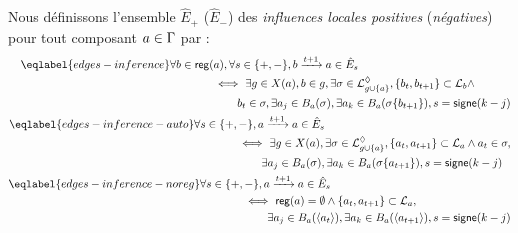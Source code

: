 \begin{proposition}
  Nous définissons l'ensemble $\hat{E}_+$ (\resp $\hat{E}_-$)
  des \emph{influences locales positives} (\resp \emph{négatives})
  pour tout composant $a \in \mathrm{\Gamma}$ par :
  \begin{align}
    \begin{split}\eqlabel{edges-inference}
      &\forall b \in \reg(a), \forall s \in \{ +, - \},
        b \xrightarrow{t+1} a \in \hat{E}_s \\
      &\qquad\qquad \Longleftrightarrow\ \exists g \in X(a), b \in g,
        \exists \sigma \in \PHsubl_{g \cup \{ a \}},
        \{ b_t, b_{t+1} \} \subset \PHl_b \wedge \\
      &\qquad\qquad\qquad b_t \in \sigma,
        \exists a_j \in \irB_a(\sigma),
        \exists a_k \in \irB_a(\sigma\{b_{t+1}\}),
        s = \f{signe}(k - j)
    \end{split} \\
    \begin{split}\eqlabel{edges-inference-auto}
      &\forall s \in \{ +, - \},
        a \xrightarrow{t+1} a \in \hat{E}_s \\
      &\qquad\qquad \Longleftrightarrow\ \exists g \in X(a),
        \exists \sigma \in \PHsubl_{g \cup \{ a \}},
        \{ a_t, a_{t+1} \} \subset \PHl_a \wedge a_t \in \sigma, \\
      &\qquad\qquad\qquad \exists a_j \in \irB_a(\sigma),
        \exists a_k \in \irB_a(\sigma\{a_{t+1}\}),
        s = \f{signe}(k - j)
    \end{split}\\
    \begin{split}\eqlabel{edges-inference-noreg}
      &\forall s \in \{ +, - \},
        a \xrightarrow{t+1} a \in \hat{E}_s \\
      &\qquad\qquad \Longleftrightarrow\ \reg(a) = \emptyset \wedge
        \{ a_t, a_{t+1} \} \subset \PHl_a, \\
      &\qquad\qquad\qquad \exists a_j \in \irB_a(\etat{a_t}),
        \exists a_k \in \irB_a(\etat{a_{t+1}}),
        s = \f{signe}(k - j)
    \end{split}

\end{align}
\end{proposition}
